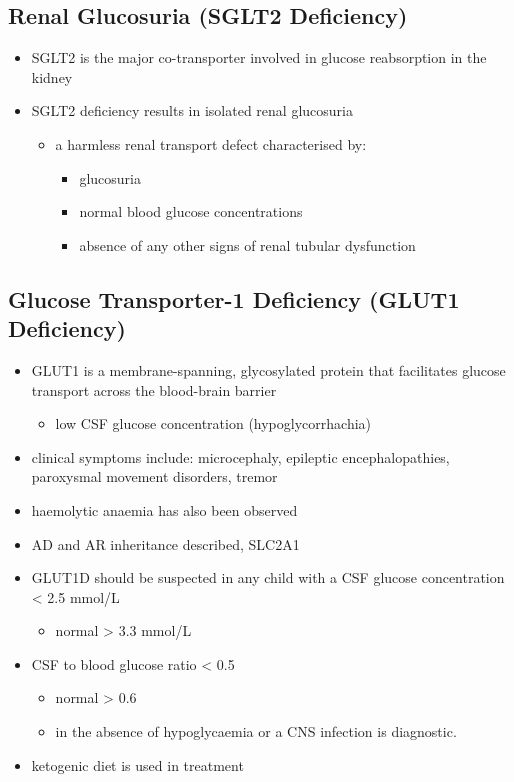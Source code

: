 \documentclass{scrartcl}
\begin{document}
\subsection{Renal Glucosuria (SGLT2 Deficiency)}
\label{sec:org5196f16}
\begin{itemize}
\item SGLT2 is the major co-transporter involved in glucose reabsorption in
the kidney
\item SGLT2 deficiency results in isolated renal glucosuria
\begin{itemize}
\item a harmless renal transport defect characterised by:
\begin{itemize}
\item glucosuria
\item normal blood glucose concentrations
\item absence of any other signs of renal tubular dysfunction
\end{itemize}
\end{itemize}
\end{itemize}

\subsection{Glucose Transporter-1 Deficiency (GLUT1 Deficiency)}
\label{sec:orgb549eb0}
\begin{itemize}
\item GLUT1 is a membrane-spanning, glycosylated protein that facilitates
glucose transport across the blood-brain barrier
\begin{itemize}
\item low CSF glucose concentration (hypoglycorrhachia)
\end{itemize}

\item clinical symptoms include: microcephaly, epileptic encephalopathies,
paroxysmal movement disorders, tremor
\item haemolytic anaemia has also been observed

\item AD and AR inheritance described, SLC2A1

\item GLUT1D should be suspected in any child with a CSF glucose
concentration \textless{} 2.5 mmol/L 
\begin{itemize}
\item normal \textgreater{} 3.3 mmol/L
\end{itemize}

\item CSF to blood glucose ratio \textless{} 0.5 
\begin{itemize}
\item normal \textgreater{} 0.6
\item in the absence of hypoglycaemia or a CNS infection is diagnostic.
\end{itemize}
\item ketogenic diet is used in treatment
\end{itemize}
\end{document}
